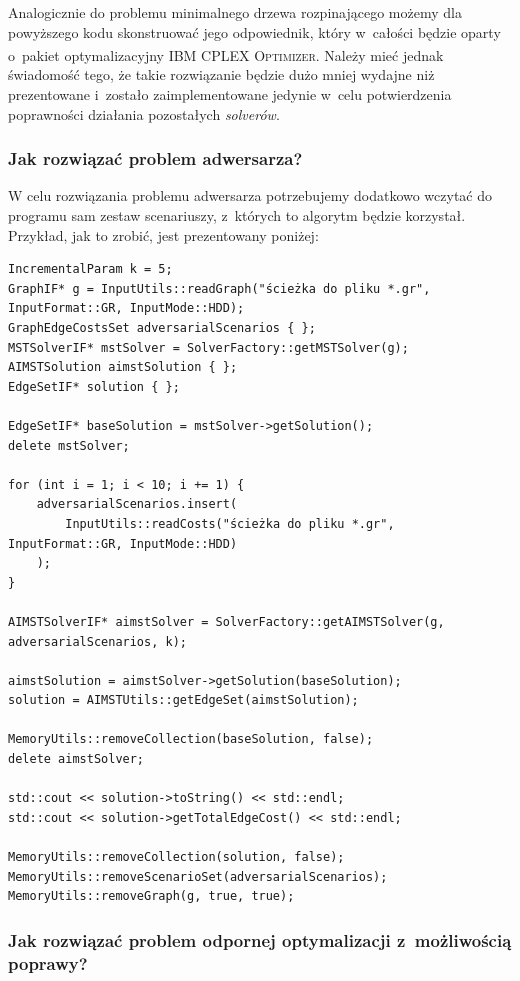 Analogicznie do problemu minimalnego drzewa rozpinającego możemy dla powyższego kodu skonstruować jego odpowiednik, który w~całości będzie oparty o~pakiet optymalizacyjny \textsc{IBM\textsuperscript{\textregistered} CPLEX\textsuperscript{\textregistered} Optimizer}. 
Należy mieć jednak świadomość tego, że takie rozwiązanie będzie dużo mniej wydajne niż prezentowane i~zostało zaimplementowane jedynie w~celu potwierdzenia poprawności działania pozostałych \textit{solverów}.


\subsubsection{Jak rozwiązać problem adwersarza?}


W celu rozwiązania problemu adwersarza potrzebujemy dodatkowo wczytać do programu sam zestaw scenariuszy, z~których to algorytm będzie korzystał.
Przykład, jak to zrobić, jest prezentowany poniżej:

\begin{verbatim}
IncrementalParam k = 5;
GraphIF* g = InputUtils::readGraph("ścieżka do pliku *.gr", InputFormat::GR, InputMode::HDD);
GraphEdgeCostsSet adversarialScenarios { };
MSTSolverIF* mstSolver = SolverFactory::getMSTSolver(g);
AIMSTSolution aimstSolution { };
EdgeSetIF* solution { };

EdgeSetIF* baseSolution = mstSolver->getSolution();
delete mstSolver;

for (int i = 1; i < 10; i += 1) {
	adversarialScenarios.insert(
		InputUtils::readCosts("ścieżka do pliku *.gr", InputFormat::GR, InputMode::HDD)
	);
}

AIMSTSolverIF* aimstSolver = SolverFactory::getAIMSTSolver(g, adversarialScenarios, k);

aimstSolution = aimstSolver->getSolution(baseSolution);
solution = AIMSTUtils::getEdgeSet(aimstSolution);

MemoryUtils::removeCollection(baseSolution, false);
delete aimstSolver;

std::cout << solution->toString() << std::endl;
std::cout << solution->getTotalEdgeCost() << std::endl;

MemoryUtils::removeCollection(solution, false);
MemoryUtils::removeScenarioSet(adversarialScenarios);
MemoryUtils::removeGraph(g, true, true);
\end{verbatim}


\subsubsection{Jak rozwiązać problem odpornej optymalizacji z~możliwością poprawy?}



